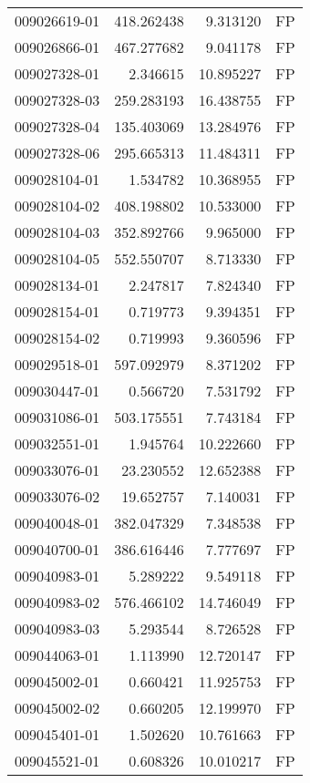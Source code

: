 \begin{tabular}{lrrl}
009026619-01 &  418.262438 &     9.313120 &   FP \\
009026866-01 &  467.277682 &     9.041178 &   FP \\
009027328-01 &    2.346615 &    10.895227 &   FP \\
009027328-03 &  259.283193 &    16.438755 &   FP \\
009027328-04 &  135.403069 &    13.284976 &   FP \\
009027328-06 &  295.665313 &    11.484311 &   FP \\
009028104-01 &    1.534782 &    10.368955 &   FP \\
009028104-02 &  408.198802 &    10.533000 &   FP \\
009028104-03 &  352.892766 &     9.965000 &   FP \\
009028104-05 &  552.550707 &     8.713330 &   FP \\
009028134-01 &    2.247817 &     7.824340 &   FP \\
009028154-01 &    0.719773 &     9.394351 &   FP \\
009028154-02 &    0.719993 &     9.360596 &   FP \\
009029518-01 &  597.092979 &     8.371202 &   FP \\
009030447-01 &    0.566720 &     7.531792 &   FP \\
009031086-01 &  503.175551 &     7.743184 &   FP \\
009032551-01 &    1.945764 &    10.222660 &   FP \\
009033076-01 &   23.230552 &    12.652388 &   FP \\
009033076-02 &   19.652757 &     7.140031 &   FP \\
009040048-01 &  382.047329 &     7.348538 &   FP \\
009040700-01 &  386.616446 &     7.777697 &   FP \\
009040983-01 &    5.289222 &     9.549118 &   FP \\
009040983-02 &  576.466102 &    14.746049 &   FP \\
009040983-03 &    5.293544 &     8.726528 &   FP \\
009044063-01 &    1.113990 &    12.720147 &   FP \\
009045002-01 &    0.660421 &    11.925753 &   FP \\
009045002-02 &    0.660205 &    12.199970 &   FP \\
009045401-01 &    1.502620 &    10.761663 &   FP \\
009045521-01 &    0.608326 &    10.010217 &   FP \\

\end{tabular}
